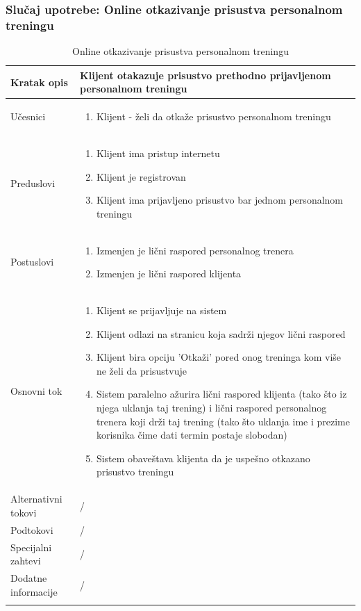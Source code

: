 \subsubsection{Slučaj upotrebe: Online otkazivanje prisustva personalnom treningu}


\begin{longtable}{| p{} | p{} |} 
\hline
    Kratak opis & Klijent otakazuje prisustvo prethodno prijavljenom personalnom treningu \\ 
\hline    
    Učesnici &  
    \begin{enumerate}
    \item Klijent - želi da otkaže prisustvo personalnom treningu
    \end{enumerate}\\
\hline
   Preduslovi & 
   \begin{enumerate}
    \item Klijent ima pristup internetu
    \item Klijent je registrovan
    \item Klijent ima prijavljeno prisustvo bar jednom personalnom treningu
   \end{enumerate}\\
\hline  
    Postuslovi & 
    \begin{enumerate}
    \item Izmenjen je lični raspored personalnog trenera
    \item Izmenjen je lični raspored klijenta
   \end{enumerate} \\
\hline
    Osnovni tok & 
    \begin{enumerate}
    \item Klijent se prijavljuje na sistem
    \item Klijent odlazi na stranicu koja sadrži njegov lični raspored
    \item Klijent bira opciju 'Otkaži' pored onog treninga kom više ne želi da prisustvuje
    \item Sistem paralelno ažurira lični raspored klijenta (tako što iz njega uklanja taj trening) i lični raspored personalnog trenera koji drži taj trening (tako što uklanja ime i prezime korisnika čime dati termin postaje slobodan)
    \item Sistem obaveštava klijenta da je uspešno otkazano prisustvo treningu
   \end{enumerate}\\
\hline
    Alternativni tokovi & /\\
\hline
    Podtokovi & /\\
\hline
    Specijalni zahtevi & /\\
\hline
    Dodatne informacije & /\\
\hline
\caption{Online otkazivanje prisustva personalnom treningu}
\end{longtable}




